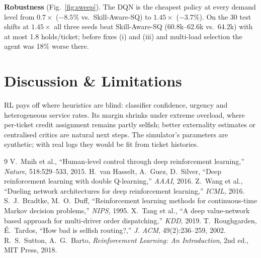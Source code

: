\documentclass[10pt,twocolumn]{article}
\begin{document}
\textbf{Robustness} (Fig.~\ref{fig:sweep}). The DQN is the cheapest policy at every demand
level from $0.7\times$ ($-8.5\%$ vs.\ Skill-Aware-SQ) to $1.45\times$ ($-3.7\%$). On the 30 test
shifts at $1.45\times$ all three seeds beat Skill-Aware-SQ (60.8k--62.6k vs.\ 64.2k) with at most
1.8 holds/ticket; before fixes (i) and (iii) and multi-load selection the agent was 18\% worse there.

\section{Discussion \& Limitations}
RL pays off where heuristics are blind: classifier confidence, urgency and heterogeneous service
rates. Its margin shrinks under extreme overload, where per-ticket credit assignment remains
partly selfish; better externality estimates or centralised critics are natural next steps. The
simulator's parameters are synthetic; with real logs they would be fit from ticket histories.

\footnotesize
\begin{thebibliography}{9}\setlength{\itemsep}{0pt}
 V.~Mnih et al., ``Human-level control through deep reinforcement learning,'' \emph{Nature}, 518:529--533, 2015.
 H.~van Hasselt, A.~Guez, D.~Silver, ``Deep reinforcement learning with double Q-learning,'' \emph{AAAI}, 2016.
 Z.~Wang et al., ``Dueling network architectures for deep reinforcement learning,'' \emph{ICML}, 2016.
 S.~J.~Bradtke, M.~O.~Duff, ``Reinforcement learning methods for continuous-time Markov decision problems,'' \emph{NIPS}, 1995.
 X.~Tang et al., ``A deep value-network based approach for multi-driver order dispatching,'' \emph{KDD}, 2019.
 T.~Roughgarden, \'E.~Tardos, ``How bad is selfish routing?,'' \emph{J. ACM}, 49(2):236--259, 2002.
 R.~S.~Sutton, A.~G.~Barto, \emph{Reinforcement Learning: An Introduction}, 2nd ed., MIT Press, 2018.
\end{thebibliography}
\end{document}
